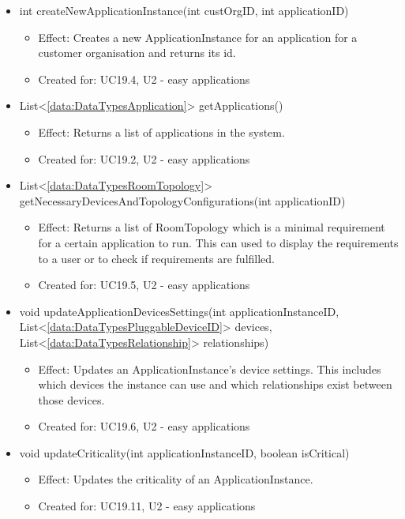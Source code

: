 \begin{description}
\begin{itemize}[noitemsep,nolistsep,leftmargin=-.25cm]
\begin{itemize}
        \end{itemize}
      \item \textsf{int createNewApplicationInstance(int custOrgID, int applicationID)}
        \begin{itemize}[noitemsep,nolistsep]
           \item Effect: Creates a new ApplicationInstance for an application for a customer organisation and returns its id.
\item Created for: UC19.4, U2 - easy applications
        \end{itemize}
      \item \textsf{List\textless{}\ref{data:DataTypesApplication}\textgreater{} getApplications()}
        \begin{itemize}[noitemsep,nolistsep]
           \item Effect: Returns a list of applications in the system.
\item Created for: UC19.2, U2 - easy applications
        \end{itemize}
      \item \textsf{List\textless{}\ref{data:DataTypesRoomTopology}\textgreater{} getNecessaryDevicesAndTopologyConfigurations(int applicationID)}
        \begin{itemize}[noitemsep,nolistsep]
           \item Effect: Returns a list of RoomTopology which is a minimal requirement for a certain application to run. This can used to display the requirements to a user or to check if requirements are fulfilled.
\item Created for: UC19.5, U2 - easy applications
        \end{itemize}
      \item \textsf{void updateApplicationDevicesSettings(int applicationInstanceID, List\textless{}\ref{data:DataTypesPluggableDeviceID}\textgreater{} devices, List\textless{}\ref{data:DataTypesRelationship}\textgreater{} relationships)}
        \begin{itemize}[noitemsep,nolistsep]
           \item Effect: Updates an ApplicationInstance's device settings. This includes which devices the instance can use and which relationships exist between those devices.
\item Created for: UC19.6, U2 - easy applications
        \end{itemize}
      \item \textsf{void updateCriticality(int applicationInstanceID, boolean isCritical)}
        \begin{itemize}[noitemsep,nolistsep]
           \item Effect: Updates the criticality of an ApplicationInstance.
\item Created for: UC19.11, U2 - easy applications
        \end{itemize}
    \end{itemize}
    \end{description}

